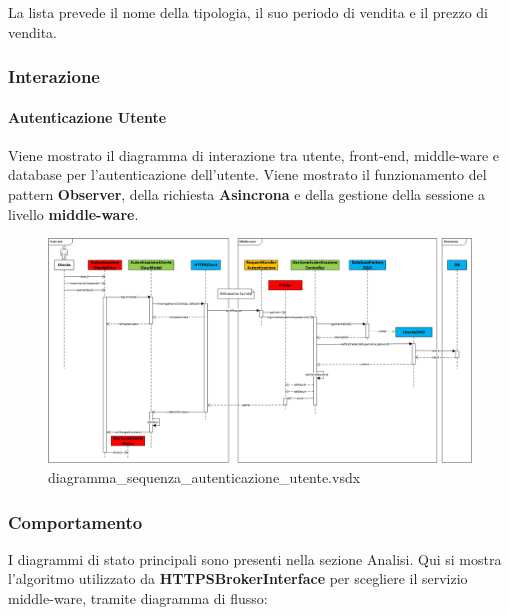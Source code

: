 \documentclass[a4paper]{article}
\begin{document}
La lista prevede il nome della tipologia, il suo periodo di vendita e il prezzo di vendita.

\newpage

\subsubsection{Interazione}

\paragraph{Autenticazione Utente} Viene mostrato il diagramma di interazione tra utente, front-end, middle-ware e database per l'autenticazione dell'utente. Viene mostrato il funzionamento del pattern \textbf{Observer}, della richiesta \textbf{Asincrona} e della gestione della sessione a livello \textbf{middle-ware}.

\begin{figure}[H]
    \includegraphics[angle=90,scale=0.55]{Progettazione/Interazione/diagramma_sequenza_autenticazione_utente.png}
    \centering
    \caption{diagramma\_sequenza\_autenticazione\_utente.vsdx}
\end{figure}

\newpage

\subsubsection{Comportamento}

I diagrammi di stato principali sono presenti nella sezione Analisi. Qui si mostra l'algoritmo utilizzato da \textbf{HTTPSBrokerInterface} per scegliere il servizio middle-ware, tramite diagramma di flusso:
\end{document}
